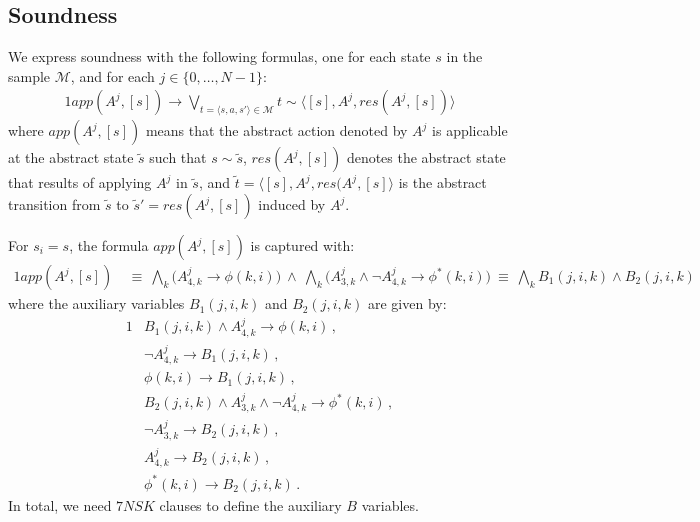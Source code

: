 \documentclass[10pt]{article}
\newcommand{\tup}[1]{\langle #1 \rangle}
\newcommand{\M}{\mathcal{M}}
\begin{document}
\subsection{Soundness}

We express soundness with the following formulas, one for each state $s$ in the
sample $\M$, and for each $j\in\{0,\ldots,N-1\}$:
\begin{alignat}{1}
  \label{eq:soundness}
  app(A^j,[s]) \rightarrow \textstyle\bigvee_{t=\tup{s,a,s'}\in\M} t \sim \tup{[s],A^j,res(A^j,[s])}
\end{alignat}
where $app(A^j,[s])$ means that the abstract action denoted by $A^j$ is applicable
at the abstract state $\tilde s$ such that $s\sim\tilde s$, $res(A^j,[s])$ denotes
the abstract state that results of applying $A^j$ in $\tilde s$, and
$\tilde t = \tup{[s],A^j,res(A^j,[s]}$ is the abstract transition from $\tilde s$
to $\tilde s'=res(A^j,[s])$ induced by $A^j$.

For $s_i=s$, the formula $app(A^j,[s])$ is captured with:
\begin{alignat}{1}
  app(A^j,[s])\
    &\equiv\ \bigwedge_{k} \biggl(A^j_{4,k} \rightarrow \phi(k,i)\biggr)\ \land\
             \bigwedge_{k} \biggl(A^j_{3,k} \land \neg A^j_{4,k} \rightarrow \phi^*(k,i)\biggr)\
     \equiv\ \bigwedge_{k} B_1(j,i,k) \land B_2(j,i,k)
\end{alignat}
where the auxiliary variables $B_1(j,i,k)$ and $B_2(j,i,k)$ are given by:
\begin{alignat}{1}
  &B_1(j,i,k) \land A^j_{4,k} \rightarrow \phi(k,i)\,, \\
  &\neg A^j_{4,k} \rightarrow B_1(j,i,k)\,, \\
  &\phi(k,i) \rightarrow B_1(j,i,k)\,, \\[1em]
  &B_2(j,i,k) \land A^j_{3,k} \land \neg A^j_{4,k} \rightarrow \phi^*(k,i)\,, \\
  &\neg A^j_{3,k} \rightarrow B_2(j,i,k)\,, \\
  &A^j_{4,k} \rightarrow B_2(j,i,k)\,, \\
  &\phi^*(k,i) \rightarrow B_2(j,i,k)\,.
\end{alignat}
In total, we need $7NSK$ clauses to define the auxiliary $B$ variables.
\end{document}
